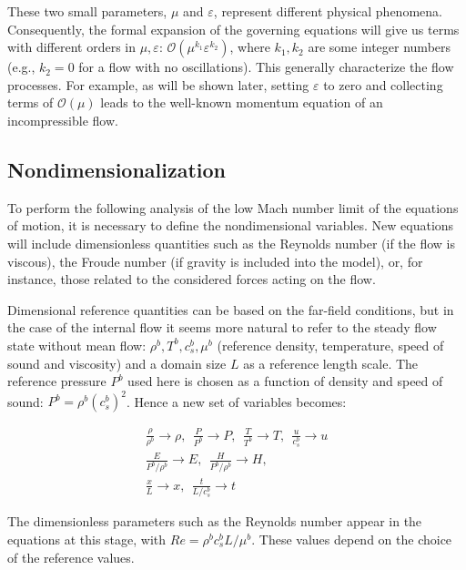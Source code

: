 These two small parameters, $\mu$ and $\varepsilon$, represent different physical phenomena. Consequently, the formal expansion of the governing equations will give us terms with different orders in $\mu, \varepsilon$: $\mathcal{O}(\mu^{k_1}\varepsilon^{k_2})$, where $k_1, k_2$ are some integer numbers (e.g., $k_2 = 0$ for a flow with no oscillations). This generally characterize the flow processes. For example, as will be shown later, setting $\varepsilon$ to zero and collecting terms of $\mathcal{O}(\mu)$ leads to the well-known momentum equation of an incompressible flow.

\subsection{Nondimensionalization}

To perform the following analysis of the low Mach number limit of the equations of motion, it is necessary to define the nondimensional variables. New equations will include dimensionless quantities such as the Reynolds number (if the flow is viscous), the Froude number (if gravity is included into the model), or, for instance, those related to the considered forces acting on the flow.

Dimensional reference quantities can be based on the far-field conditions, but in the case of the internal flow it seems more natural to refer to the steady flow state without mean flow: $\rho^b, T^b, c_s^b, \mu^b$ (reference density, temperature, speed of sound and viscosity) and a domain size $L$ as a reference length scale. The reference pressure $P^b$ used here is chosen as a function of density and speed of sound: $P^b = \rho^b (c_s^b)^2$. Hence a new set of variables becomes:

\begin{subequations}
\label{eq:NSderDimens}
\begin{align}
    \frac{\rho}{\rho^b} \rightarrow \rho, \ \ \frac{P}{P^b} \rightarrow P, \ \ \frac{T}{T^b} \rightarrow T, \ \ \frac{u}{c_s^b} \rightarrow u\\
    \frac{E}{P^b/\rho^b} \rightarrow E, \ \ \frac{H}{P^b/\rho^b} \rightarrow H, \\
    \frac{x}{L} \rightarrow x, \ \ \frac{t}{L/ c_s^b} \rightarrow t
\end{align}
\end{subequations}

The dimensionless parameters such as the Reynolds number appear in the equations at this stage, with $Re = \rho^b c_s^b L / \mu^b$. These values depend on the choice of the reference values.

